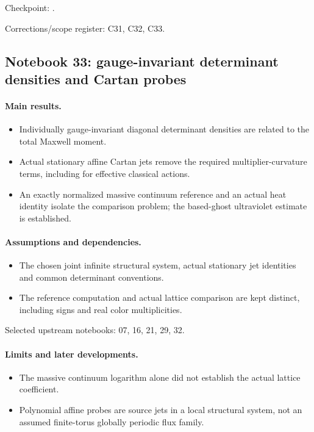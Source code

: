 Checkpoint: .\par
Corrections/scope register: C31, C32, C33.\par

\subsection{Notebook 33: gauge-invariant determinant densities and Cartan probes}
\label{hnc-33}
\noindent{}\par

\paragraph{Main results.}
\begin{itemize}
\item Individually gauge-invariant diagonal determinant densities are related to the total Maxwell moment.
\item Actual stationary affine Cartan jets remove the required multiplier-curvature terms, including for effective classical actions.
\item An exactly normalized massive continuum reference and an actual heat identity isolate the comparison problem; the based-ghost ultraviolet estimate is established.
\end{itemize}

\paragraph{Assumptions and dependencies.}
\begin{itemize}
\item The chosen joint infinite structural system, actual stationary jet identities and common determinant conventions.
\item The reference computation and actual lattice comparison are kept distinct, including signs and real color multiplicities.
\end{itemize}

Selected upstream notebooks: 07, 16, 21, 29, 32.\par

\paragraph{Limits and later developments.}
\begin{itemize}
\item The massive continuum logarithm alone did not establish the actual lattice coefficient.
\item Polynomial affine probes are source jets in a local structural system, not an assumed finite-torus globally periodic flux family.
\end{itemize}

